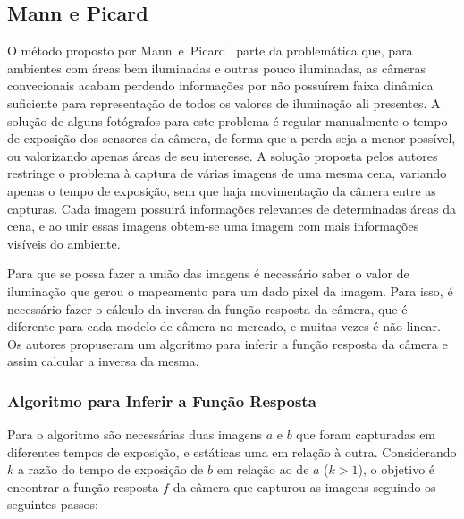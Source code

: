 \subsection{Mann e Picard} \label{metodoMann}
O método proposto por Mann~e~Picard~\cite{mann} parte da problemática que, para ambientes com áreas bem iluminadas e outras pouco iluminadas, as câmeras convecionais acabam perdendo informações por não possuírem faixa dinâmica suficiente para representação de todos os valores de iluminação ali presentes. A solução de alguns fotógrafos para este problema é regular manualmente o tempo de exposição dos sensores da câmera, de forma que a perda seja a menor possível, ou valorizando apenas áreas de seu interesse. A solução proposta pelos autores restringe o problema à captura de várias imagens de uma mesma cena, variando apenas o tempo de exposição, sem que haja movimentação da câmera entre as capturas. Cada imagem possuirá informações relevantes de determinadas áreas da cena, e ao unir essas imagens obtem-se uma imagem com mais informações visíveis do ambiente.
 
 
Para que se possa fazer a união das imagens é necessário saber o valor de iluminação que gerou o mapeamento para um dado pixel da imagem. Para isso, é necessário fazer o cálculo da inversa da função resposta da câmera, que é diferente para cada modelo de câmera no mercado, e muitas vezes é não-linear. Os autores propuseram um algoritmo para inferir a função resposta da câmera e assim calcular a inversa da mesma.

\subsubsection{Algoritmo para Inferir a Função Resposta} \label{metodoMannAlg}

Para o algoritmo são necessárias duas imagens $a$ e $b$ que foram capturadas em diferentes tempos de exposição, e estáticas uma em relação à outra. Considerando $k$ a razão do tempo de exposição de $b$ em relação ao de $a$ ($k > 1$), o objetivo é encontrar a função resposta $f$ da câmera que capturou as imagens seguindo os seguintes passos:

